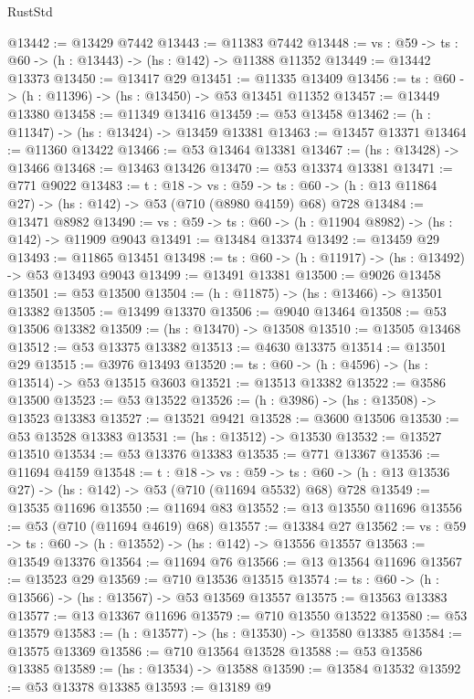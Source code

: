 \begin{lexlean}{RustStd}
\begin{coremodule}
@13442 := @13429 @7442
@13443 := @11383 @7442
@13448 := {vs : @59} -> {ts : @60} -> (h : @13443) -> (hs : @142) -> @11388 @11352
@13449 := @13442 @13373
@13450 := @13417 @29
@13451 := @11335 @13409
@13456 := {ts : @60} -> (h : @11396) -> (hs : @13450) -> @53 @13451 @11352
@13457 := @13449 @13380
@13458 := @11349 @13416
@13459 := @53 @13458
@13462 := (h : @11347) -> (hs : @13424) -> @13459 @13381
@13463 := @13457 @13371
@13464 := @11360 @13422
@13466 := @53 @13464 @13381
@13467 := (hs : @13428) -> @13466
@13468 := @13463 @13426
@13470 := @53 @13374 @13381
@13471 := @771 @9022
@13483 := {t : @18} ->
  {vs : @59} ->
  {ts : @60} -> (h : @13 @11864 @27) -> (hs : @142) -> @53 (@710 (@8980 @4159) @68) @728
@13484 := @13471 @8982
@13490 := {vs : @59} -> {ts : @60} -> (h : @11904 @8982) -> (hs : @142) -> @11909 @9043
@13491 := @13484 @13374
@13492 := @13459 @29
@13493 := @11865 @13451
@13498 := {ts : @60} -> (h : @11917) -> (hs : @13492) -> @53 @13493 @9043
@13499 := @13491 @13381
@13500 := @9026 @13458
@13501 := @53 @13500
@13504 := (h : @11875) -> (hs : @13466) -> @13501 @13382
@13505 := @13499 @13370
@13506 := @9040 @13464
@13508 := @53 @13506 @13382
@13509 := (hs : @13470) -> @13508
@13510 := @13505 @13468
@13512 := @53 @13375 @13382
@13513 := @4630 @13375
@13514 := @13501 @29
@13515 := @3976 @13493
@13520 := {ts : @60} -> (h : @4596) -> (hs : @13514) -> @53 @13515 @3603
@13521 := @13513 @13382
@13522 := @3586 @13500
@13523 := @53 @13522
@13526 := (h : @3986) -> (hs : @13508) -> @13523 @13383
@13527 := @13521 @9421
@13528 := @3600 @13506
@13530 := @53 @13528 @13383
@13531 := (hs : @13512) -> @13530
@13532 := @13527 @13510
@13534 := @53 @13376 @13383
@13535 := @771 @13367
@13536 := @11694 @4159
@13548 := {t : @18} ->
  {vs : @59} ->
  {ts : @60} -> (h : @13 @13536 @27) -> (hs : @142) -> @53 (@710 (@11694 @5532) @68) @728
@13549 := @13535 @11696
@13550 := @11694 @83
@13552 := @13 @13550 @11696
@13556 := @53 (@710 (@11694 @4619) @68)
@13557 := @13384 @27
@13562 := {vs : @59} -> {ts : @60} -> (h : @13552) -> (hs : @142) -> @13556 @13557
@13563 := @13549 @13376
@13564 := @11694 @76
@13566 := @13 @13564 @11696
@13567 := @13523 @29
@13569 := @710 @13536 @13515
@13574 := {ts : @60} -> (h : @13566) -> (hs : @13567) -> @53 @13569 @13557
@13575 := @13563 @13383
@13577 := @13 @13367 @11696
@13579 := @710 @13550 @13522
@13580 := @53 @13579
@13583 := (h : @13577) -> (hs : @13530) -> @13580 @13385
@13584 := @13575 @13369
@13586 := @710 @13564 @13528
@13588 := @53 @13586 @13385
@13589 := (hs : @13534) -> @13588
@13590 := @13584 @13532
@13592 := @53 @13378 @13385
@13593 := @13189 @9

\end{coremodule}
\end{lexlean}
